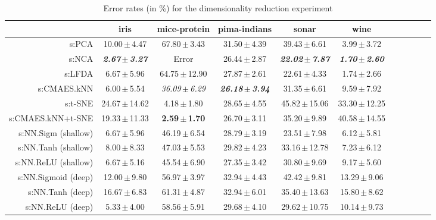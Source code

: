 \begin{table}[ht]
{\begin{tabular}{rcccccccccc}
& \multicolumn{1}{c}{iris} & \multicolumn{1}{c}{mice-protein} & \multicolumn{1}{c}{pima-indians} & \multicolumn{1}{c}{sonar} & \multicolumn{1}{c}{wine} \\ 
\midrule
s:PCA & 10.00\,$\pm$\,4.47 & 67.80\,$\pm$\,3.43 & 31.50\,$\pm$\,4.39 & 39.43\,$\pm$\,6.61 & 3.99\,$\pm$\,3.72 \\
s:NCA & \emph{\textbf{2.67\,$\pm$\,3.27}} & Error  & 26.44\,$\pm$\,2.87 & \emph{\textbf{22.02\,$\pm$\,7.87}} & \emph{\textbf{1.70\,$\pm$\,2.60}} \\
s:LFDA & 6.67\,$\pm$\,5.96 & 64.75\,$\pm$\,12.90 & 27.87\,$\pm$\,2.61 & 22.61\,$\pm$\,4.33 & 1.74\,$\pm$\,2.66 \\
s:CMAES.kNN & 6.00\,$\pm$\,5.54 & \emph{36.09\,$\pm$\,6.29} & \emph{\textbf{26.18\,$\pm$\,3.94}} & 31.35\,$\pm$\,6.61 & 9.59\,$\pm$\,7.92 \\
s:t-SNE & 24.67\,$\pm$\,14.62 & 4.18\,$\pm$\,1.80 & 28.65\,$\pm$\,4.55 & 45.82\,$\pm$\,15.06 & 33.30\,$\pm$\,12.25 \\
s:CMAES.kNN+t-SNE & 19.33\,$\pm$\,11.33 & \textbf{2.59\,$\pm$\,1.70} & 26.70\,$\pm$\,3.11 & 35.20\,$\pm$\,9.89 & 40.58\,$\pm$\,14.55 \\
s:NN.Sigm (shallow) & 6.67\,$\pm$\,5.96 & 46.19\,$\pm$\,6.54 & 28.79\,$\pm$\,3.19 & 23.51\,$\pm$\,7.98 & 6.12\,$\pm$\,5.81 \\
s:NN.Tanh (shallow) & 8.00\,$\pm$\,8.33 & 47.03\,$\pm$\,5.53 & 29.82\,$\pm$\,4.23 & 33.16\,$\pm$\,12.78 & 7.23\,$\pm$\,6.12 \\
s:NN.ReLU (shallow) & 6.67\,$\pm$\,5.16 & 45.54\,$\pm$\,6.90 & 27.35\,$\pm$\,3.42 & 30.80\,$\pm$\,9.69 & 9.17\,$\pm$\,5.60 \\
s:NN.Sigmoid (deep) & 12.00\,$\pm$\,9.80 & 56.97\,$\pm$\,3.97 & 32.94\,$\pm$\,4.43 & 42.42\,$\pm$\,9.81 & 13.29\,$\pm$\,9.06 \\
s:NN.Tanh (deep) & 16.67\,$\pm$\,6.83 & 61.31\,$\pm$\,4.87 & 32.94\,$\pm$\,6.01 & 35.40\,$\pm$\,13.63 & 15.80\,$\pm$\,8.62 \\
s:NN.ReLU (deep) & 5.33\,$\pm$\,4.00 & 58.56\,$\pm$\,5.91 & 29.68\,$\pm$\,4.10 & 29.62\,$\pm$\,10.75 & 10.14\,$\pm$\,9.73 \\


\bottomrule
\end{tabular}
}
\caption{Error rates (in \%) for the dimensionality reduction experiment} \label{tab:dim-error-rates}
\end{table}
